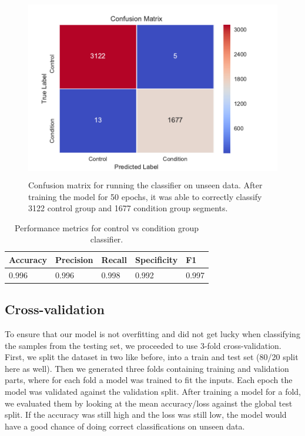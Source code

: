 \begin{figure}
\begin{center}
      \includegraphics[height=8cm]{img/control_condition/50ep.pdf}
      \caption{Confusion matrix for running the classifier on unseen data. After training the model for 50 epochs, it was able to correctly classify 3122 control group and 1677 condition group segments.}
      \label{figure:control_condition_confusion_matrix_48h}
\end{center}
\end{figure}


\begin{table}[h]
\begin{center}
      \begin{tabular}{|l|l|l|l|l|}
            \hline
            \bfseries Accuracy & \bfseries Precision & \bfseries Recall & \bfseries Specificity & \bfseries F1 \\\hline
            0.996 & 0.996 & 0.998 & 0.992 & 0.997 \\\hline
      \end{tabular}
      \caption{Performance metrics for control vs condition group classifier.}
      \label{table:control_condition_performance}
\end{center}
\end{table}

\vfill

\subsection{Cross-validation}

To ensure that our model is not overfitting and did not get lucky when classifying the samples from the testing set, we proceeded to use 3-fold cross-validation. First, we split the dataset in two like before, into a train and test set (80/20 split here as well). Then we generated three folds containing training and validation parts, where for each fold a model was trained to fit the inputs. Each epoch the model was validated against the validation split. After training a model for a fold, we evaluated them by looking at the mean accuracy/loss against the global test split. If the accuracy was still high and the loss was still low, the model would have a good chance of doing correct classifications on unseen data.

